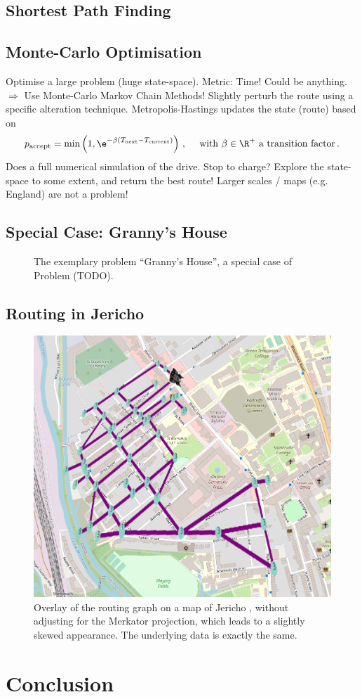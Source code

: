 \documentclass{prettytex/ox/mmsc-special-topic}
\begin{document}
  \subsection{Shortest Path Finding}
  \subsection{Monte-Carlo Optimisation}
  Optimise a large problem (huge state-space). Metric: Time! Could be anything.
  $\Rightarrow$ Use Monte-Carlo Markov Chain Methods!
  Slightly perturb the route using a specific alteration technique.
  Metropolis-Hastings updates the state (route) based on $$p_{\rm accept} = \min\left(1, \e^{-\beta (T_{\rm next} - T_{\rm current})}\right)\,, \quad \text{ with } \beta \in \R^+ \text{ a transition factor} \,.$$
  Does a full numerical simulation of the drive. Stop to charge?
  Explore the state-space to some extent, and return the best route!
  Larger scales / maps (e.g. England) are not a problem!

  \subsection{Special Case: Granny's House}
  \begin{figure}[H]
    \centering
    \caption{The exemplary problem ``Granny's House'', a special case of Problem (TODO).}
  \end{figure}

  \subsection{Routing in Jericho}
  \begin{figure}[H]
    \centering
    \includegraphics[width=0.6\linewidth]{figures/jericho.png}
    \caption{Overlay of the routing graph on a map of Jericho \parencite{OpenStreetMap}, without adjusting for the Merkator projection, which leads to a slightly skewed appearance. The underlying data is exactly the same.}
  \end{figure}

  \section{Conclusion}

  \pagebreak
  \printbibliography
\end{document}
